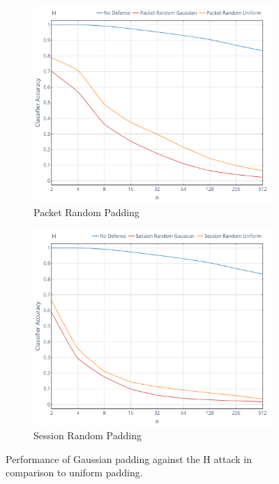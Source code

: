 \documentclass[
	ruledheaders=chapter,
	class=report,
	thesis={type=master, department=inf},
	accentcolor=1c,
	custommargins=true,
	marginpar=false,
	parskip=half-,
	fontsize=11pt,
]{tudapub}
\begin{document}
	\begin{figure}[tbp]
		\begin{subfigure}{0.495\textwidth}
			\centering
			\includegraphics[width=\textwidth]{plots/performance_h_pkt.png}
			\caption{Packet Random Padding}
		\end{subfigure}
		\hfill
		\begin{subfigure}{0.495\textwidth}
			\centering
			\includegraphics[width=\textwidth]{plots/performance_h_ses.png}
			\caption{Session Random Padding}
		\end{subfigure}
		\caption[Performance of Gaussian padding against the H attack]{Performance of Gaussian padding against the H attack \cite{Herrmann2009} in comparison to uniform padding.}
		\label{fig:h}
	\end{figure}
\end{document}
